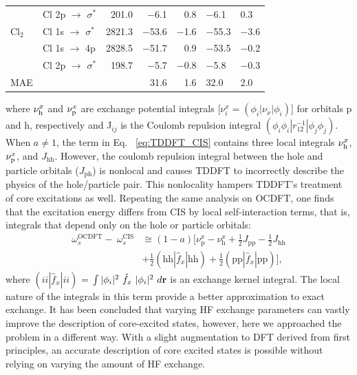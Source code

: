 \documentclass[12pt]{article}
\begin{document}
\begin{table}[!t]
\begin{tabular*}{8.cm}{@{\extracolsep{\fill} }llrrrHH}
    ~         & Cl 2p $\rightarrow$  $\sigma^*$    & 201.0 & $-$6.1 & 0.8   & $-$6.1    & 0.3 \\
    Cl$_2$      & Cl 1s $\rightarrow$ $\sigma^*$          & 2821.3   & $-$53.6      & $-$1.6   & $-$55.3    & $-$3.6   \\
    ~         & Cl 1s $\rightarrow$ 4p          & 2828.5 & $-$51.7    & 0.9  & $-$53.5     & $-$0.2  \\
        ~         & Cl 2p $\rightarrow$  $\sigma^*$    & 198.7 & $-$5.7     & $-$0.8  & $-$5.8    & $-$0.3\\
    MAE         &                            & ~     & 31.6      & 1.6   & 32.0     & 2.0   \\
    \hline
    \hline
    \end{tabular*}
     \label{table:SecondRow}
\end{table}
where $\nu_{\rm h}^x$ and $\nu_{\rm p}^x$ are exchange potential integrals [$\nu_{i}^x = (\phi_{i}|\nu_x|\phi_{i})$] for orbitals p and h, respectively and J$_{ij}$ is the Coulomb repulsion integral $(\phi_i \phi_i|r_{12}^{-1}|\phi_j \phi_j)$. When $a \neq 1$, the term in Eq. ~\ref{eq:TDDFT_CIS} contains three local integrals $\nu_{\rm h}^x$, $\nu_{\rm p}^x$, and $J_{\text{hh}}$. However, the coulomb repulsion integral between the hole and particle orbitals ($J_{\text{ph}}$) is nonlocal and causes TDDFT to incorrectly describe the physics of the hole/particle pair. This nonlocality hampers TDDFT's treatment of core excitations as well. Repeating the same analysis on OCDFT, one finds that the excitation energy differs from CIS by local self-interaction terms, that is, integrals that depend only on the hole or particle orbitals:
\begin{align}
\nonumber \omega^{\text{OCDFT}}_s - \ \omega^{\text{CIS}}_s  &\cong (1 - a) [\nu_{\text{p}}^x - \nu_{\text{h}}^x + \frac{1}{2} J_{\text{pp}} - \frac{1}{2} J_{\text{hh}} \\
&+ \frac{1}{2} (\text{hh}|\hat{f}_x|\text{hh}) +\frac{1}{2} (\text{pp}|\hat{f}_x|\text{pp})] ,
\end{align}
where $(ii|\hat{f}_x|ii)$ = $\int |\phi_{i}|^2\ \hat{f}_x\  |\phi_{i}|^2 \ d\bf{r}$ is an exchange kernel integral. The local nature of the integrals in this term provide a better approximation to exact exchange. It has been concluded that varying HF exchange parameters can vastly improve the description of core-excited states,\cite{heyd_hybrid_2003,nakata_time-dependent_2006,song_core-excitation_2008,henderson_importance_2007,henderson_assessment_2008} however, here we approached the problem in a different way. With a slight augmentation to DFT derived from first principles, an accurate description of core excited states is possible without relying on varying the amount of HF exchange.
\end{document}
